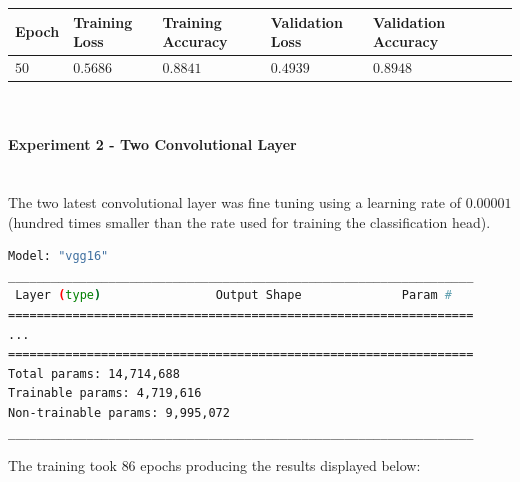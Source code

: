 \documentclass[11pt,a4paper]{article}
\begin{document}
\begin{center}
\hspace*{-0.8cm}
\begin{tabular}{|p{1.2cm}|p{1.8cm}|p{2cm}|p{2cm}|p{2cm}|p{2cm}|p{2cm}|}
\rowcolor{gray!50}
\hline
\textbf{Epoch} & \textbf{Training Loss} & \textbf{Training Accuracy} & \textbf{Validation Loss} & \textbf{Validation Accuracy}\\
\hline
$50$ & $0.5686$ & $0.8841$ & $0.4939$ & $0.8948$\\
\hline
\end{tabular}\\
\end{center}
\paragraph{Experiment 2 - Two Convolutional Layer}\mbox{}\\
The two latest convolutional layer was fine tuning using a learning rate of $0.00001$ (hundred times smaller than the rate used for training the classification head).
\begin{lstlisting}[language=bash,frame=single]
Model: "vgg16"
_________________________________________________________________
 Layer (type)                Output Shape              Param #   
=================================================================
...
=================================================================
Total params: 14,714,688
Trainable params: 4,719,616
Non-trainable params: 9,995,072
_________________________________________________________________
\end{lstlisting}
The training took $86$ epochs producing the results displayed below:
\end{document}
